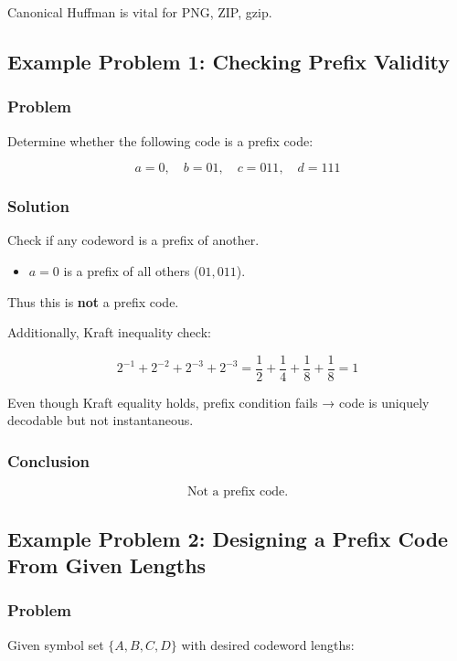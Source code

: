 \documentclass{AnantDocumentation}
\begin{document}
Canonical Huffman is vital for PNG, ZIP, gzip.

\subsection{Example Problem 1: Checking Prefix Validity}

\subsubsection*{Problem}

Determine whether the following code is a prefix code:

\[
a=0,\quad b=01,\quad c=011,\quad d=111
\]

\subsubsection*{Solution}

Check if any codeword is a prefix of another.

\begin{itemize}
\item \(a = 0\) is a prefix of all others (\(01, 011\)).
\end{itemize}

Thus this is \textbf{not} a prefix code.

Additionally, Kraft inequality check:

\[
2^{-1} + 2^{-2} + 2^{-3} + 2^{-3} = \frac{1}{2} + \frac{1}{4} + \frac{1}{8} + \frac{1}{8} = 1
\]

Even though Kraft equality holds, prefix condition fails → code is uniquely decodable but not instantaneous.

\subsubsection*{Conclusion}

\[
\boxed{\text{Not a prefix code.}}
\]

\subsection{Example Problem 2: Designing a Prefix Code From Given Lengths}

\subsubsection*{Problem}

Given symbol set \( \{A, B, C, D\} \) with desired codeword lengths:
\end{document}
